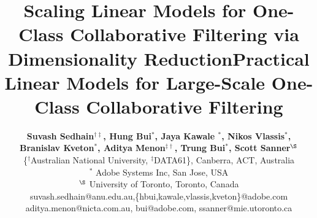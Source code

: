 \documentclass{article}
\begin{document}








\title{Scaling Linear Models for One-Class Collaborative Filtering via Dimensionality Reduction}
\title{Practical Linear Models for Large-Scale One-Class Collaborative Filtering}

\author { \textbf{Suvash Sedhain$^{\dag\ddagger}$, Hung Bui$^{*}$, Jaya Kawale $^{*}$, Nikos Vlassis$^{*}$,} \\ \textbf{Branislav Kveton$^{*}$, Aditya Menon$^{\ddagger\dag}$, Trung Bui$^{*}$, Scott Sanner$^{\S}$}\\
\{$^{\dag}$Australian National University, $^{\ddagger}$DATA61\}, Canberra, ACT, Australia\\
$^{*}$ Adobe Systems Inc, San Jose,  USA\\
$^{\S}$  University of Toronto, Toronto, Canada\\
suvash.sedhain@anu.edu.au,\{hbui,kawale,vlassis,kveton\}@adobe.com\\ aditya.menon@nicta.com.au, bui@adobe.com, ssanner@mie.utoronto.ca
}%
\end{document}
